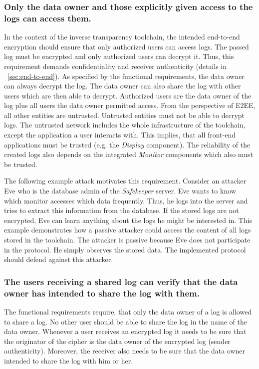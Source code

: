 \documentclass[../main.tex]{subfiles}
\begin{document}
\subsubsection{Only the data owner and those explicitly given access to the logs can access them.}
In the context of the inverse transparency toolchain, the intended end-to-end encryption should ensure that only authorized users can access logs.
The passed log must be encrypted and only authorized users can decrypt it.
Thus, this requirement demands confidentiality and receiver authenticity (details in ~\cref{sec:end-to-end}).
As specified by the functional requirements, the data owner can always decrypt the log.
The data owner can also share the log with other users which are then able to decrypt.
Authorized users are the data owner of the log plus all users the data owner permitted access.
From the perspective of E2EE, all other entities are untrusted.
Untrusted entities must not be able to decrypt logs.
The untrusted network includes the whole infrastructure of the toolchain, except the application a user interacts with.
This implies, that all front-end applications must be trusted (e.g. the \emph{Display} component).
The reliability of the created logs also depends on the integrated \emph{Monitor} components which also must be trusted.

The following example attack motivates this requirement.
Consider an attacker Eve who is the database admin of the \emph{Safekeeper} server.
Eve wants to know which monitor accesses which data frequently.
Thus, he logs into the server and tries to extract this information from the database.
If the stored logs are not encrypted, Eve can learn anything about the logs he might be interested in.
This example demonstrates how a passive attacker could access the content of all logs stored in the toolchain.
The attacker is passive because Eve does not participate in the protocol.
He simply observes the stored data.
The implemented protocol should defend against this attacker.


\subsubsection{The users receiving a shared log can verify that the data owner has intended to share the log with them.}

The functional requirements require, that only the data owner of a log is allowed to share a log.
No other user should be able to share the log in the name of the data owner.
Whenever a user receives an encrypted log it needs to be sure that the originator of the cipher is the data owner of the encrypted log (sender authenticity).
Moreover, the receiver also needs to be sure that the data owner intended to share the log with him or her.
\end{document}
